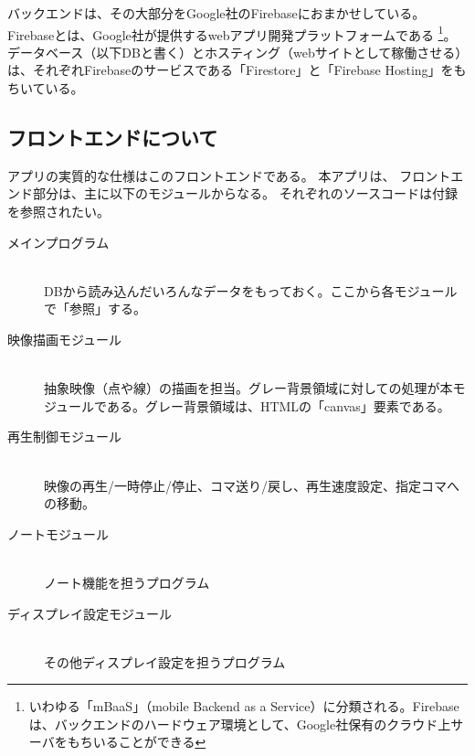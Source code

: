 バックエンドは、その大部分をGoogle社のFirebaseにおまかせしている。
Firebaseとは、Google社が提供するwebアプリ開発プラットフォームである
\footnote{いわゆる「mBaaS」（mobile Backend as a Service）に分類される。Firebaseは、バックエンドのハードウェア環境として、Google社保有のクラウド上サーバをもちいることができる}。
データベース（以下DBと書く）とホスティング（webサイトとして稼働させる）は、それぞれFirebaseのサービスである「Firestore」と「Firebase Hosting」をもちいている。


\subsection{フロントエンドについて}
アプリの実質的な仕様はこのフロントエンドである。
本アプリは、
フロントエンド部分は、主に以下のモジュールからなる。
それぞれのソースコードは付録を参照されたい。
\begin{description}
  \item [メインプログラム]\mbox{}\\
    DBから読み込んだいろんなデータをもっておく。ここから各モジュールで「参照」する。
  \item [映像描画モジュール]\mbox{}\\
    抽象映像（点や線）の描画を担当。グレー背景領域に対しての処理が本モジュールである。グレー背景領域は、HTMLの「canvas」要素である。
  \item [再生制御モジュール]\mbox{}\\
    映像の再生/一時停止/停止、コマ送り/戻し、再生速度設定、指定コマへの移動。
  \item [ノートモジュール]\mbox{}\\
    ノート機能を担うプログラム
  \item [ディスプレイ設定モジュール]\mbox{}\\
    その他ディスプレイ設定を担うプログラム
\end{description}


